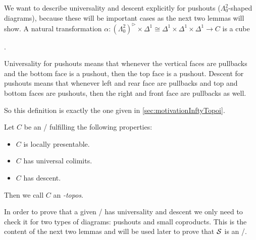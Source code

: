 \begin{remark}
    We want to describe universality and descent explicitly for pushouts ($\Lambda^2_0$-shaped diagrams), because these will be important cases as the next two lemmas will show.
    A natural transformation $\alpha\colon\left(\Lambda_0^2\right)^{\rhd}\times\Delta^1\cong\Delta^1\times\Delta^1\times\Delta^1\to C$ is a cube
    \begin{center}
        \;.
    \end{center}
    Universality for pushouts means that whenever the vertical faces are pullbacks and the bottom face is a pushout, then the top face is a pushout.
    Descent for pushouts means that whenever left and rear face are pullbacks and top and bottom faces are pushouts, then the right and front face are pullbacks as well.
    
    So this definition is exactly the one given in \cref{sec:motivationInftyTopoi}.
\end{remark}
\begin{definition}
    Let $C$ be an \inftycat/ fulfilling the following properties:
    \begin{itemize}
        \item $C$ is locally presentable.
        \item $C$ has universal colimits.
        \item $C$ has descent.
    \end{itemize}
    Then we call $C$ an \emph{\infty-topos}.
\end{definition}
In order to prove that a given \inftycat/ has universality and descent we only need to check it for two types of diagrams: pushouts and small coproducts.
This is the content of the next two lemmas and will be used later to prove that $\mathcal{S}$ is an \inftytop/.
